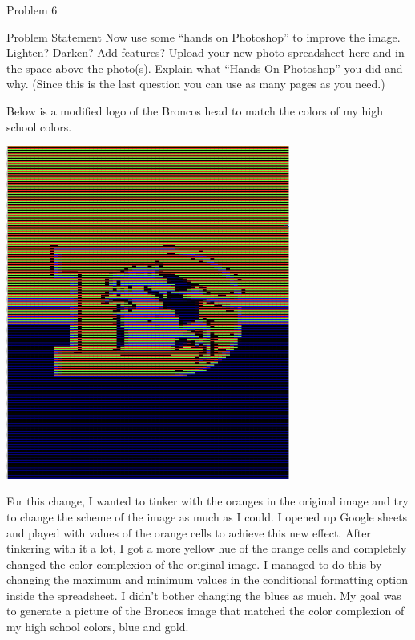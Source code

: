 \begin{problem}{Problem 6}
    \begin{statement}{Problem Statement}
        Now use some “hands on Photoshop” to improve the image. Lighten? Darken? Add features? Upload your new photo spreadsheet here and in the space above the photo(s). Explain what “Hands On Photoshop” 
        you did and why. (Since this is the last question you can use as many pages as you need.)
    \end{statement}

    \begin{Highlight}[Solution]
        Below is a modified logo of the Broncos head to match the colors of my high school colors.
        \begin{center}
            \includegraphics[width=0.7\textwidth]{Images/Broncos Recolored.png}
        \end{center}
        For this change, I wanted to tinker with the oranges in the original image and try to change the scheme of the image as much as I could. I opened up Google sheets and played with values of the 
        orange cells to achieve this new effect. After tinkering with it a lot, I got a more yellow hue of the orange cells and completely changed the color complexion of the original image. I managed to 
        do this by changing the maximum and minimum values in the conditional formatting option inside the spreadsheet. I didn't bother changing the blues as much. My goal was to generate a picture of the
        Broncos image that matched the color complexion of my high school colors, blue and gold.
    \end{Highlight}
\end{problem}
